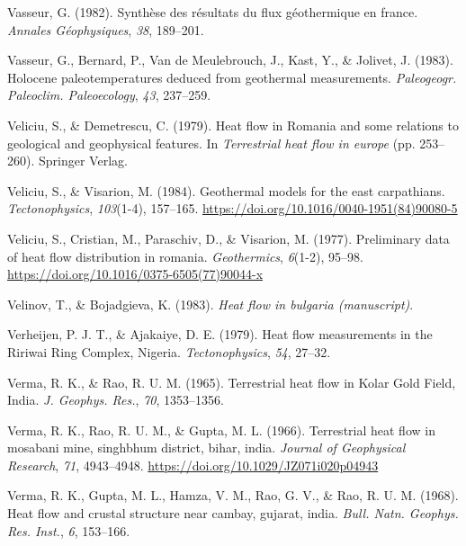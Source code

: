 \begin{CSLReferences}{1}{1}
\leavevmode{}%
Vasseur, G. (1982). Synthèse des résultats du flux géothermique en france. \emph{Annales Géophysiques}, \emph{38}, 189--201.

\leavevmode{}%
Vasseur, G., Bernard, P., Van de Meulebrouch, J., Kast, Y., \& Jolivet, J. (1983). Holocene paleotemperatures deduced from geothermal measurements. \emph{Paleogeogr. Paleoclim. Paleoecology}, \emph{43}, 237--259.

\leavevmode{}%
Veliciu, S., \& Demetrescu, C. (1979). Heat flow in {Romania} and some relations to geological and geophysical features. In \emph{Terrestrial heat flow in europe} (pp. 253--260). Springer Verlag.

\leavevmode{}%
Veliciu, S., \& Visarion, M. (1984). Geothermal models for the east carpathians. \emph{Tectonophysics}, \emph{103}(1-4), 157--165. \url{https://doi.org/10.1016/0040-1951(84)90080-5}

\leavevmode{}%
Veliciu, S., Cristian, M., Paraschiv, D., \& Visarion, M. (1977). Preliminary data of heat flow distribution in romania. \emph{Geothermics}, \emph{6}(1-2), 95--98. \url{https://doi.org/10.1016/0375-6505(77)90044-x}

\leavevmode{}%
Velinov, T., \& Bojadgieva, K. (1983). \emph{Heat flow in bulgaria (manuscript)}.

\leavevmode{}%
Verheijen, P. J. T., \& Ajakaiye, D. E. (1979). Heat flow measurements in the {Ririwai Ring Complex, Nigeria}. \emph{Tectonophysics}, \emph{54}, 27--32.

\leavevmode{}%
Verma, R. K., \& Rao, R. U. M. (1965). Terrestrial heat flow in {Kolar Gold Field}, {India}. \emph{J. Geophys. Res.}, \emph{70}, 1353--1356.

\leavevmode{}%
Verma, R. K., Rao, R. U. M., \& Gupta, M. L. (1966). Terrestrial heat flow in mosabani mine, singhbhum district, bihar, india. \emph{Journal of Geophysical Research}, \emph{71}, 4943--4948. \url{https://doi.org/10.1029/JZ071i020p04943}

\leavevmode{}%
Verma, R. K., Gupta, M. L., Hamza, V. M., Rao, G. V., \& Rao, R. U. M. (1968). Heat flow and crustal structure near cambay, gujarat, india. \emph{Bull. Natn. Geophys. Res. Inst.}, \emph{6}, 153--166.


\end{CSLReferences}
